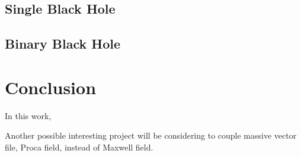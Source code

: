 \documentclass[%
 reprint,
 amsmath,amssymb,
 aps,
]{revtex4-1}
\begin{document}
\subsection{Single Black Hole}
\subsection{Binary Black Hole}

\section{Conclusion}
In this work, 

Another possible interesting project will be considering to couple massive vector file, Proca field, instead of Maxwell field.



\appendix
\end{document}
